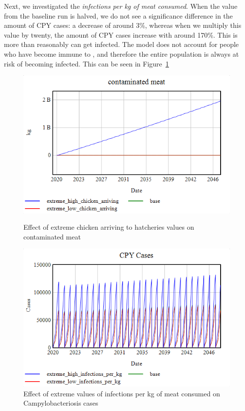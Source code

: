 Next, we investigated the \textit{infections per kg of meat consumed}. When the value from the baseline run is halved, we do not see a significance difference in the amount of CPY cases: a decrease of around 3\%, whereas when we multiply this value by twenty, the amount of CPY cases increase with around 170\%. This is more than reasonably can get infected. The model does not account for people who have become immune to , and therefore the entire population is always at risk of becoming infected. This can be seen in Figure~\ref{fig:infections_cases}

\begin{figure}[h!]
    \centering
    \begin{minipage}{0.45\textwidth}
        \centering
        \includegraphics[width=\textwidth]{images/extremes/Chicken_arriving_contaminated_meat.png} 
        \caption{Effect of extreme chicken arriving to hatcheries values on contaminated meat}
        \label{fig:chicken_meat}
    \end{minipage}
    \begin{minipage}{0.45\textwidth}
        \centering
        \includegraphics[width=\textwidth]{images/extremes/Infections_per_kg_CPY_cases.png} 
        \caption{Effect of extreme values of infections per kg of meat consumed on Campylobacteriosis cases}
        \label{fig:infections_cases}
    \end{minipage}
\end{figure}

